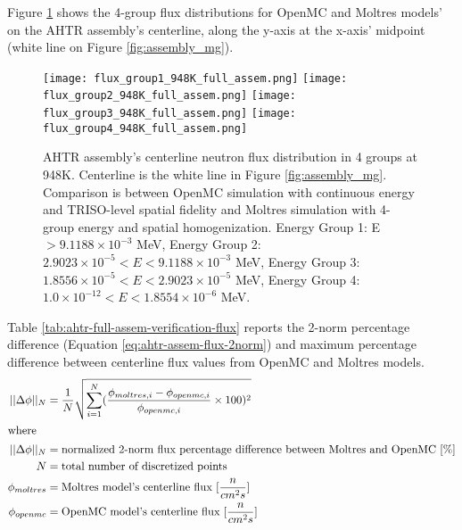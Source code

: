 Figure \ref{fig:flux_948K_full_assem} shows the 4-group flux distributions for OpenMC and 
Moltres models' on the \gls{AHTR} assembly's centerline, along the y-axis at 
the x-axis' midpoint (white line on Figure \ref{fig:assembly_mg}). 
\begin{figure}[htbp]
    \centering
    \texttt{[image: flux\_group1\_948K\_full\_assem.png]} 
    \texttt{[image: flux\_group2\_948K\_full\_assem.png]} 
    \texttt{[image: flux\_group3\_948K\_full\_assem.png]} 
    \texttt{[image: flux\_group4\_948K\_full\_assem.png]} 
    \caption{\acrfull{AHTR} assembly's centerline neutron flux distribution 
    in 4 groups at 948K. 
    Centerline is the white line in Figure \ref{fig:assembly_mg}.
    Comparison is between OpenMC simulation with continuous energy 
    and TRISO-level spatial fidelity and Moltres simulation with 4-group energy and 
    spatial homogenization.
    Energy Group 1: E $> 9.1188 \times 10^{-3}$ MeV, 
    Energy Group 2: $2.9023 \times 10^{-5} < E < 9.1188 \times 10^{-3}$ MeV,
    Energy Group 3:  $1.8556 \times 10^{-5} < E < 2.9023 \times 10^{-5}$ MeV,
    Energy Group 4:  $1.0 \times 10^{-12} < E < 1.8554 \times 10^{-6}$ MeV.}
    \label{fig:flux_948K_full_assem}
\end{figure}
Table \ref{tab:ahtr-full-assem-verification-flux} reports the 2-norm percentage 
difference (Equation \ref{eq:ahtr-assem-flux-2norm}) and maximum percentage 
difference between centerline flux values from OpenMC and Moltres models. 
\begin{align}
    \label{eq:ahtr-assem-flux-2norm}
    ||\Delta \phi||_N &= \frac{1}{N}\sqrt{\sum_{i=1}^N(\frac{\phi_{moltres, i} - \phi_{openmc, i}}{\phi_{openmc, i}}\times100)^2} \\
\intertext{where}
    ||\Delta \phi||_N &= \mbox{normalized 2-norm flux percentage difference between Moltres and OpenMC } [\%] \nonumber \\
    N &= \mbox{total number of discretized points} \nonumber \\
    \phi_{moltres} &= \mbox{Moltres model's centerline flux } [\frac{n}{cm^2s}] \nonumber \\
    \phi_{openmc} &= \mbox{OpenMC model's centerline flux } [\frac{n}{cm^2s}] \nonumber 
\end{align} 
